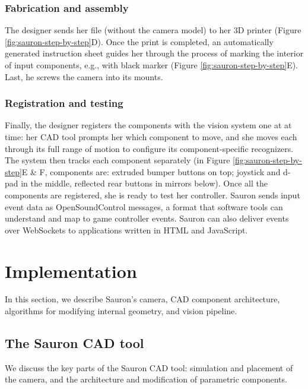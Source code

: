 \subsubsection{Fabrication and assembly} %
The designer sends her file (without the camera model) to her 3D printer (Figure \ref{fig:sauron-step-by-step}D). Once the print is completed, an automatically generated instruction sheet guides her through the process of marking the interior of input components, e.g., with black marker (Figure \ref{fig:sauron-step-by-step}E). Last, he screws the camera into its mounts. 

\subsubsection{Registration and testing} Finally, the designer registers the components with the vision system one at at time: her CAD tool prompts her which component to move, and she moves each through its full range of motion to configure its component-specific recognizers. The system then tracks each component separately (in Figure \ref{fig:sauron-step-by-step}E \& F, components are: extruded bumper buttons on top; joystick and d-pad in the middle, reflected rear buttons in mirrors below). Once all the components are registered, she is ready to test her controller.
Sauron sends input event data as OpenSoundControl messages, a format that software tools can understand and map to game controller events. Sauron can also deliver events over WebSockets to applications written in HTML and JavaScript.

\section{Implementation}

In this section, we describe Sauron's camera, CAD component architecture, algorithms for modifying internal geometry, and vision pipeline. 


    \subsection{The Sauron CAD tool}
     
     We discuss the key parts of the Sauron CAD tool: simulation and placement of the camera, and the architecture and modification of parametric components.
    


